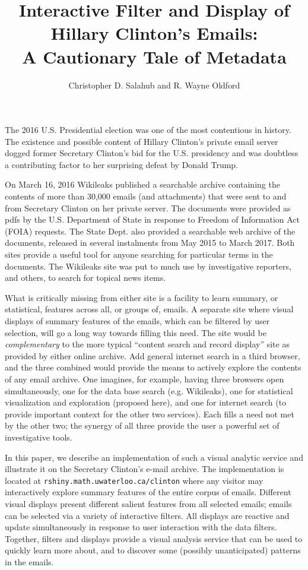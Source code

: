 \documentclass[journal]{vgtc}                %
\title{Interactive Filter and Display of Hillary Clinton's Emails: \\A Cautionary Tale of Metadata}
\author{Christopher D. Salahub and R. Wayne Oldford}
\begin{document}
\maketitle
The 2016 U.S. Presidential election was one of the most contentious in history.  The existence and possible content of Hillary Clinton's private email server dogged former Secretary Clinton's bid for the U.S. presidency and was doubtless a contributing factor to her surprising defeat by Donald Trump.

On March 16, 2016 Wikileaks  published a searchable archive \cite{Wikileaks} containing the contents of more than 30,000 emails (and attachments) that were sent to and from Secretary Clinton on her private server.  The documents were provided as pdfs by the U.S. Department of State in response to Freedom of Information Act (FOIA) \cite{FOIA} requests.  The State Dept. also provided a searchable web archive of the documents, released in several instalments from May 2015 to March 2017\cite{StateDeptFOIA}.   Both sites provide a  useful tool for anyone searching for particular terms in the documents.  The Wikileaks site was put to much use by investigative reporters, and others, to search for topical news items.

What is critically missing from either site is a facility to learn summary, or statistical, features across all, or groups of,  emails.   A separate site where visual displays of summary features of the emails, which can be filtered by user selection, will go a long way towards filling this need.  The site would be \emph{complementary} to the more typical ``content search and record display'' site as provided by either online archive.   Add general internet search in a third browser, and the three combined would provide the means to actively explore the contents of any email archive.    One imagines, for example, having three browsers open simultaneously, one for the data base search (e.g. Wikileaks), one for statistical visualization and exploration (proposed here), and one for internet search (to provide important context for the other two services).  Each fills a need not met by the other two; the synergy of all three provide the user a powerful set of investigative tools.

In this paper, we describe an implementation of such a visual analytic service and illustrate it on the Secretary Clinton's e-mail archive.  The implementation is located at  \texttt{rshiny.math.uwaterloo.ca/clinton} where any visitor may interactively explore summary features  of the entire corpus of emails.   Different visual displays present different salient features from all selected emails; emails can be selected via a variety of interactive filters.   All displays are reactive and update simultaneously in response to user interaction with the data filters.  Together, filters and displays provide a visual analysis service that can be used to quickly learn more about, and to discover some (possibly unanticipated) patterns in the emails. 
\end{document}

